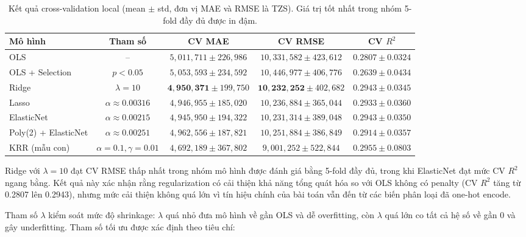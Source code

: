 \begin{table}[H]
\centering
\caption{Kết quả cross-validation local (mean $\pm$ std, đơn vị MAE và RMSE là TZS). Giá trị tốt nhất trong nhóm 5-fold đầy đủ được in đậm.}
\label{tab:cv_results}
\begin{tabular}{@{}lcccc@{}}
\toprule
\textbf{Mô hình} & \textbf{Tham số} & \textbf{CV MAE} & \textbf{CV RMSE} & \textbf{CV $R^2$} \\
\midrule
OLS                  & --                         & $5{,}011{,}711 \pm 226{,}986$ & $10{,}331{,}582 \pm 423{,}612$ & $0.2807 \pm 0.0324$ \\
OLS + Selection      & $p < 0.05$                 & $5{,}053{,}593 \pm 234{,}592$ & $10{,}446{,}977 \pm 406{,}776$ & $0.2639 \pm 0.0434$ \\
Ridge                & $\lambda = 10$             & $\mathbf{4{,}950{,}371} \pm 199{,}750$ & $\mathbf{10{,}232{,}252} \pm 402{,}682$ & $\mathbf{0.2943} \pm 0.0345$ \\
Lasso                & $\alpha \approx 0.00316$   & $4{,}946{,}955 \pm 185{,}020$ & $10{,}236{,}884 \pm 365{,}044$ & $0.2933 \pm 0.0360$ \\
ElasticNet           & $\alpha \approx 0.00215$   & $4{,}945{,}950 \pm 194{,}322$ & $10{,}231{,}314 \pm 389{,}048$ & $0.2943 \pm 0.0350$ \\
Poly(2) + ElasticNet & $\alpha \approx 0.00251$   & $4{,}962{,}556 \pm 187{,}821$ & $10{,}251{,}884 \pm 386{,}849$ & $0.2914 \pm 0.0357$ \\
KRR (mẫu con)        & $\alpha=0.1,\gamma=0.01$   & $4{,}692{,}189 \pm 367{,}802$ & $9{,}001{,}252 \pm 522{,}844$ & $0.2955 \pm 0.0803$ \\
\bottomrule
\end{tabular}
\end{table}

Ridge với $\lambda = 10$ đạt CV RMSE thấp nhất trong nhóm mô hình được đánh giá bằng 5-fold đầy đủ, trong khi ElasticNet đạt mức CV $R^2$ ngang bằng. Kết quả này xác nhận rằng regularization có cải thiện khả năng tổng quát hóa so với OLS không có penalty (CV $R^2$ tăng từ 0.2807 lên 0.2943), nhưng mức cải thiện không quá lớn vì tín hiệu chính của bài toán vẫn đến từ các biến phân loại đã one-hot encode.


Tham số $\lambda$ kiểm soát mức độ shrinkage: $\lambda$ quá nhỏ đưa mô hình về gần OLS và dễ overfitting, còn $\lambda$ quá lớn co tất cả hệ số về gần 0 và gây underfitting. Tham số tối ưu được xác định theo tiêu chí:

